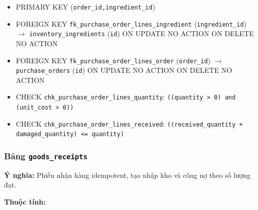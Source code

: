 \begin{itemize}

\item PRIMARY KEY (\texttt{order\_id,ingredient\_id})

\item FOREIGN KEY \texttt{fk\_purchase\_order\_lines\_ingredient} (\texttt{ingredient\_id}) $\rightarrow$ \texttt{inventory\_ingredients} (\texttt{id}) ON UPDATE NO ACTION ON DELETE NO ACTION

\item FOREIGN KEY \texttt{fk\_purchase\_order\_lines\_order} (\texttt{order\_id}) $\rightarrow$ \texttt{purchase\_orders} (\texttt{id}) ON UPDATE NO ACTION ON DELETE NO ACTION

\item CHECK \texttt{chk\_purchase\_order\_lines\_quantity}: \texttt{((quantity > 0) and (unit\_cost > 0))}

\item CHECK \texttt{chk\_purchase\_order\_lines\_received}: \texttt{((received\_quantity + damaged\_quantity) <= quantity)}

\end{itemize}

\subsubsection{Bảng \texttt{goods\_receipts}}

\textbf{Ý nghĩa:} Phiếu nhận hàng idempotent, tạo nhập kho và công nợ theo số lượng đạt.\par

\textbf{Thuộc tính:}

